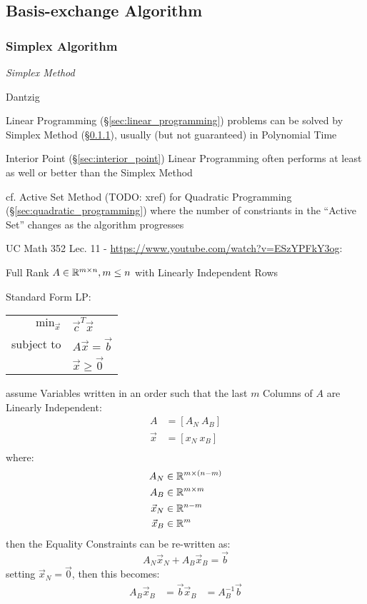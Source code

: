 \subsection{Basis-exchange Algorithm}\label{sec:basis_exchange}

\subsubsection{Simplex Algorithm}\label{sec:simplex_algorithm}

\emph{Simplex Method}

Dantzig

Linear Programming (\S\ref{sec:linear_programming}) problems can be solved by
Simplex Method (\S\ref{sec:simplex_algorithm}), usually (but not guaranteed) in
Polynomial Time

\fist Interior Point (\S\ref{sec:interior_point}) Linear Programming often
performs at least as well or better than the Simplex Method

cf. Active Set Method (TODO: xref) for Quadratic Programming
(\S\ref{sec:quadratic_programming}) where the number of constriants in the
``Active Set'' changes as the algorithm progresses

UC Math 352 Lec. 11 - \url{https://www.youtube.com/watch?v=ESzYPFkY3og}:

Full Rank $A \in \mathbb{R}^{m \times n}, m \leq n$ with Linearly Independent Rows

Standard Form LP:

\begin{tabular}{r l}
  $\mathrm{min}_{\vec{x}}$ & $\vec{c}^T\vec{x}$     \\
  subject to               & $A\vec{x} = \vec{b}$   \\
                           & $\vec{x} \geq \vec{0}$ \\
\end{tabular}

assume Variables written in an order such that the last $m$ Columns of $A$ are
Linearly Independent:
\begin{align*}
  A       & = [A_N \ A_B] \\
  \vec{x} & = [x_N \ x_B] \\
\end{align*}
where:
\begin{align*}
  A_N       & \in \mathbb{R}^{m \times (n - m)} \\
  A_B       & \in \mathbb{R}^{m \times m} \\
  \vec{x}_N & \in \mathbb{R}^{n-m} \\
  \vec{x}_B & \in \mathbb{R}^m \\
\end{align*}
then the Equality Constraints can be re-written as:
\[
  A_N\vec{x}_N + A_B\vec{x}_B = \vec{b}
\]
setting $\vec{x}_N = \vec{0}$, then this becomes:
\begin{align*}
  A_B\vec{x}_B & = \vec{b}
  \vec{x}_B    & = A_B^{-1}\vec{b}
\end{align*}

